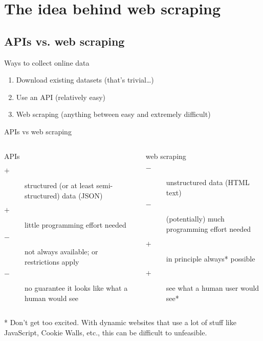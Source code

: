 \section{The idea behind web scraping}
\subsection{APIs vs. web scraping}

\begin{frame}{Ways to collect online data}
  \begin{enumerate}
  \item Download existing datasets (that's trivial\ldots)
  \item Use an API (relatively easy)
  \item Web scraping (anything between easy and extremely difficult)
  \end{enumerate}
\end{frame}


\begin{frame}{APIs vs web scraping}
  \begin{columns}[t]
    \begin{block}{APIs}
      \begin{description}
      \item[$+$] structured (or at least semi-structured) data (JSON)
      \item[$+$] little programming effort needed
      \item[$-$] not always available; or restrictions apply
      \item[$-$] no guarantee it looks like what a human would see
      \end{description}
    \end{block}
    \pause
    \begin{alertblock}{web scraping}
      \begin{description}
      \item[$-$] unstructured data (HTML text)
      \item[$-$] (potentially) much programming effort needed
      \item[$+$] in principle always* possible
      \item[$+$] see what a human user would see*
      \end{description}
    \end{alertblock}
  \end{columns}

* \footnotesize{Don't get too excited. With dynamic websites that use a lot of stuff like JavaScript, Cookie Walls, etc., this can be difficult to unfeasible.}
\end{frame}


